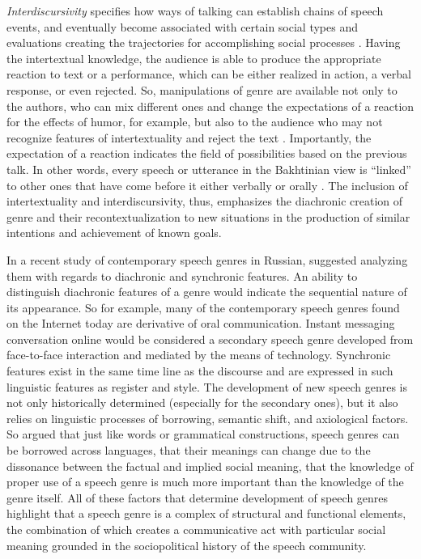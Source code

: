 \documentclass[12pt]{article}
\begin{document}
\textit{Interdiscursivity} specifies how ways of talking can establish chains of speech events, and eventually become associated with certain social types and evaluations creating the trajectories for accomplishing social processes \parencite{agha2003}. Having the intertextual knowledge, the audience is able to produce the appropriate reaction to text or a performance, which can be either realized in action, a verbal response, or even rejected. So, manipulations of genre are available not only to the authors, who can mix different ones and change the expectations of a reaction for the effects of humor, for example, but also to the audience who may not recognize features of intertextuality and reject the text \parencite{bax2011}. Importantly, the expectation of a reaction indicates the field of possibilities based on the previous talk. In other words, every speech or utterance in the Bakhtinian view is ``linked'' to other ones that have come before it either verbally or orally \parencite[p. 69]{bakhtin1986}. The inclusion of intertextuality and interdiscursivity, thus, emphasizes the diachronic creation of genre and their recontextualization to new situations in the production of similar intentions and achievement of known goals.

In a recent study of contemporary speech genres in Russian, \textcite{dementyev2015} suggested analyzing them with regards to diachronic and synchronic features. An ability to distinguish diachronic features of a genre would indicate the sequential nature of its appearance. So for example, many of the contemporary speech genres found on the Internet today are derivative of  oral communication. Instant messaging conversation online would be considered a secondary speech genre developed from face-to-face interaction and mediated by the means of technology. Synchronic features exist in the same time line as the discourse and are expressed in such linguistic features as register and style. The development of new speech genres is not only historically determined (especially for the secondary ones), but it also relies on linguistic processes of borrowing, semantic shift, and axiological factors. So \textcite[p. 81-82]{dementyev2015} argued that just like words or grammatical constructions, speech genres can be borrowed across languages, that their meanings can change  due to the dissonance between the factual and implied social meaning, that the knowledge of proper use of a speech genre is much more important than the knowledge of the genre itself. All of these factors that determine development of speech genres highlight that a speech genre is a complex of structural and functional elements, the combination of which creates a communicative act with particular social meaning grounded in the sociopolitical history of the speech community. 
\end{document}
